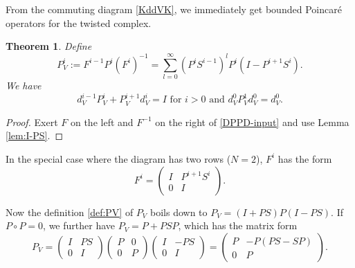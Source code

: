 \documentclass[11pt]{amsart}
\newtheorem{theorem}{Theorem}
\newtheorem{remark}{Remark}
\newcommand{\0}{\mathaccent23}
\begin{document}
 From the commuting diagram \eqref{KddVK}, we immediately get bounded Poincar\'e operators for the twisted complex. 
  \begin{theorem}\label{thm:twisted}
Define 
\begin{equation}\label{def:PV}
P_{V}^{i}:=F^{i-1}P^{i}(F^{i})^{-1}=\sum_{l=0}^{\infty}(P^{i}S^{i-1})^{l} P^{i}(I-P^{i+1}S^{i}).
\end{equation}
We have 
\begin{equation}\label{poincare-twisted}
 d^{i-1}_{V}P^i_{V}+P^{i+1}_{V}d^i_{V}=I \text{\ for\ }i>0\text{\ and\ } d^0_VP^1_Vd^0_V=d^0_V.
\end{equation} 
\end{theorem}
\begin{proof}
 Exert $F$ on the left and $F^{-1}$ on the right of \eqref{DPPD-input} and use Lemma \ref{lem:I-PS}.
\end{proof}

 
 In the special case where the diagram has two rows ($N=2$), $F^{i}$ has the form
$$
F^{i}=
\left (
\begin{array}{cc}
I & P^{i+1}S^{i}\\
0 & I
\end{array}
\right ).
$$ 
 
Now the definition \eqref{def:PV} of $P_{V}$ boils down to $P_{V}=(I+PS)P(I-P S )$. If $P\circ P=0$, we  further have $P_{V}=P+PSP$, which has the matrix form
\begin{equation}\label{PV}
P_{V}=\left ( 
\begin{array}{cc}
I & PS\\
0 & I
\end{array}
\right )\left ( 
\begin{array}{cc}
P & 0 \\
0 & P
\end{array}
\right )\left ( 
\begin{array}{cc}
I & -PS\\
0 & I
\end{array}
\right )=\left ( 
\begin{array}{cc}
P & -P(PS-SP)\\
0 & P
\end{array}
\right ).
\end{equation}
 
\end{document}
